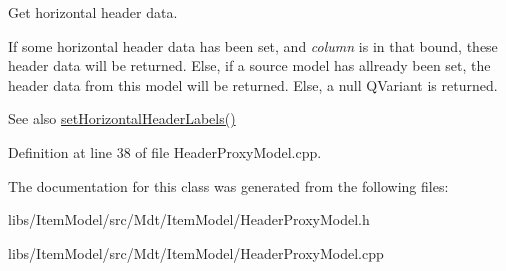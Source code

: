 Get horizontal header data. 

If some horizontal header data has been set, and {\itshape column} is in that bound, these header data will be returned. Else, if a source model has allready been set, the header data from this model will be returned. Else, a null Q\+Variant is returned.

\begin{DoxySeeAlso}{See also}
\hyperlink{class_mdt_1_1_item_model_1_1_header_proxy_model_a88a4b7d8a409e1c9f970482389942c1b}{set\+Horizontal\+Header\+Labels()} 
\end{DoxySeeAlso}


Definition at line 38 of file Header\+Proxy\+Model.\+cpp.



The documentation for this class was generated from the following files\+:\begin{DoxyCompactItemize}
\item 
libs/\+Item\+Model/src/\+Mdt/\+Item\+Model/Header\+Proxy\+Model.\+h\item 
libs/\+Item\+Model/src/\+Mdt/\+Item\+Model/Header\+Proxy\+Model.\+cpp\end{DoxyCompactItemize}
